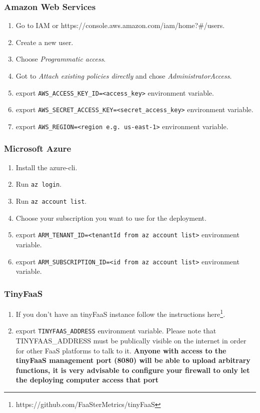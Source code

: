 \documentclass[../main.tex]{subfiles}
\begin{document}
\subsubsection{Amazon Web Services}\label{sec:providersetupaws}
\begin{enumerate}
\item Go to IAM or https://console.aws.amazon.com/iam/home?\#/users.
\item Create a new user.
\item Choose \textit{Programmatic access}.
\item Got to \textit{Attach existing policies directly} and chose \textit{AdministratorAccess}.
\item export \texttt{AWS\_ACCESS\_KEY\_ID=<access\_key>} environment variable.
\item export \texttt{AWS\_SECRET\_ACCESS\_KEY=<secret\_access\_key>} environment variable.
\item export \texttt{AWS\_REGION=<region e.g. us-east-1>} environment variable.
\end{enumerate}

\subsubsection{Microsoft Azure}\label{sec:providersetupazure}
\begin{enumerate}
\item Install the azure-cli.
\item Run \texttt{az login}.
\item Run \texttt{az account list}.
\item Choose your subscription you want to use for the deployment.
\item export \texttt{ARM\_TENANT\_ID=<tenantId from az account list>} environment variable.
\item export \texttt{ARM\_SUBSCRIPTION\_ID=<id from az account list>} environment variable.
\end{enumerate}

\subsubsection{TinyFaaS}\label{sec:providersetuptinyfaas}

\begin{enumerate}
\item If you don't have an tinyFaaS instance follow the instructions here\footnote{https://github.com/FaaSterMetrics/tinyFaaS}.
\item export \texttt{TINYFAAS\_ADDRESS} environment variable. Please note that TINYFAAS\_ADDRESS must be publically visible on the internet in order for other FaaS platforms to talk to it. \textbf{Anyone with access to the tinyFaaS management port (8080) will be able to upload arbitrary functions, it is very advisable to configure your firewall to only let the deploying computer access that port}

\end{enumerate}
\end{document}
